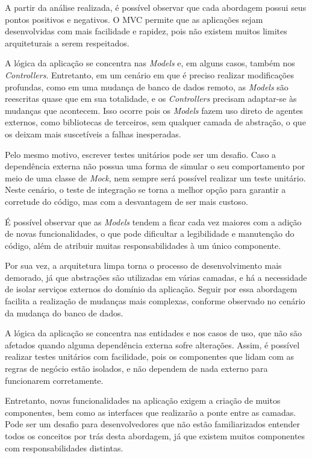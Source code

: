 A partir da análise realizada, é possível observar que cada abordagem possui seus pontos positivos e negativos.
O MVC permite que as aplicações sejam desenvolvidas com mais facilidade e rapidez, pois não existem muitos limites arquiteturais a serem respeitados.

A lógica da aplicação se concentra nas \emph{Models} e, em alguns casos, também nos \emph{Controllers}.
Entretanto, em um cenário em que é preciso realizar modificações profundas, como em uma mudança de banco de dados remoto, as \emph{Models} são reescritas quase que em sua totalidade, e os \emph{Controllers} precisam adaptar-se às mudanças que acontecem.
Isso ocorre pois os \emph{Models} fazem uso direto de agentes externos, como bibliotecas de terceiros, sem qualquer camada de abstração, o que os deixam mais suscetíveis a falhas inesperadas.

Pelo mesmo motivo, escrever testes unitários pode ser um desafio.
Caso a dependência externa não possua uma forma de simular o seu comportamento por meio de uma classe de \emph{Mock}, nem sempre será possível realizar um teste unitário.
Neste cenário, o teste de integração se torna a melhor opção para garantir a corretude do código, mas com a desvantagem de ser mais custoso.

É possível observar que as \emph{Models} tendem a ficar cada vez maiores com a adição de novas funcionalidades, o que pode dificultar a legibilidade e manutenção do código, além de atribuir muitas responsabilidades à um único componente.

Por sua vez, a arquitetura limpa torna o processo de desenvolvimento mais demorado, já que abstrações são utilizadas em várias camadas, e há a necessidade de isolar serviços externos do domínio da aplicação.
Seguir por essa abordagem facilita a realização de mudanças mais complexas, conforme observado no cenário da mudança do banco de dados.

A lógica da aplicação se concentra nas entidades e nos casos de uso, que não são afetados quando alguma dependência externa sofre alterações.
Assim, é possível realizar testes unitários com facilidade, pois os componentes que lidam com as regras de negócio estão isolados, e não dependem de nada externo para funcionarem corretamente.

Entretanto, novas funcionalidades na aplicação exigem a criação de muitos componentes, bem como as interfaces que realizarão a ponte entre as camadas.
Pode ser um desafio para desenvolvedores que não estão familiarizados entender todos os conceitos por trás desta abordagem, já que existem muitos componentes com responsabilidades distintas.

